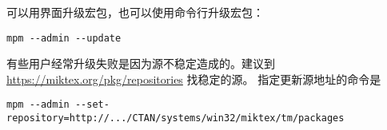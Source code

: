 
\MiKTeX{}
可以用界面升级宏包，也可以使用命令行升级宏包：
\begin{verbatim}
mpm --admin --update
\end{verbatim}

有些用户经常升级失败是因为源不稳定造成的。建议到
\url{https://miktex.org/pkg/repositories} 找稳定的源。
指定更新源地址的命令是
\begin{verbatim}
mpm --admin --set-repository=http://.../CTAN/systems/win32/miktex/tm/packages
\end{verbatim}

%
%
%
%
%
%
%



